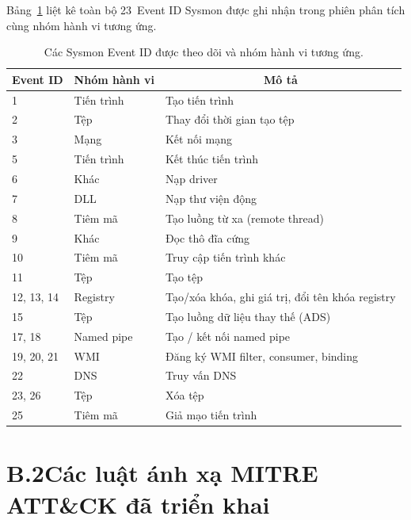 \documentclass[../DoAn.tex]{subfiles}
\begin{document}
Bảng~\ref{tab:sysmon-eids} liệt kê toàn bộ 23~Event ID Sysmon
được ghi nhận trong phiên phân tích cùng nhóm hành vi tương ứng.
\begin{table}[H]
\centering
\caption{Các Sysmon Event ID được theo dõi và nhóm hành vi tương ứng.}
\label{tab:sysmon-eids}
\begin{tabular}{|l|l|l|}
\hline
\multicolumn{1}{|c|}{\textbf{Event ID}} & \multicolumn{1}{c|}{\textbf{Nhóm hành vi}} & \multicolumn{1}{c|}{\textbf{Mô tả}} \\
\hline
1          & Tiến trình  & Tạo tiến trình \\
\hline
2          & Tệp         & Thay đổi thời gian tạo tệp \\
\hline
3          & Mạng        & Kết nối mạng \\
\hline
5          & Tiến trình  & Kết thúc tiến trình \\
\hline
6          & Khác        & Nạp driver \\
\hline
7          & DLL         & Nạp thư viện động \\
\hline
8          & Tiêm mã     & Tạo luồng từ xa (remote thread) \\
\hline
9          & Khác        & Đọc thô đĩa cứng \\
\hline
10         & Tiêm mã     & Truy cập tiến trình khác \\
\hline
11         & Tệp         & Tạo tệp \\
\hline
12, 13, 14 & Registry    & Tạo/xóa khóa, ghi giá trị, đổi tên khóa registry \\
\hline
15         & Tệp         & Tạo luồng dữ liệu thay thế (ADS) \\
\hline
17, 18     & Named pipe  & Tạo / kết nối named pipe \\
\hline
19, 20, 21 & WMI         & Đăng ký WMI filter, consumer, binding \\
\hline
22         & DNS         & Truy vấn DNS \\
\hline
23, 26     & Tệp         & Xóa tệp \\
\hline
25         & Tiêm mã     & Giả mạo tiến trình \\
\hline
\end{tabular}
\end{table}
\section*{B.2\quad Các luật ánh xạ MITRE ATT\&CK đã triển khai}
\end{document}
